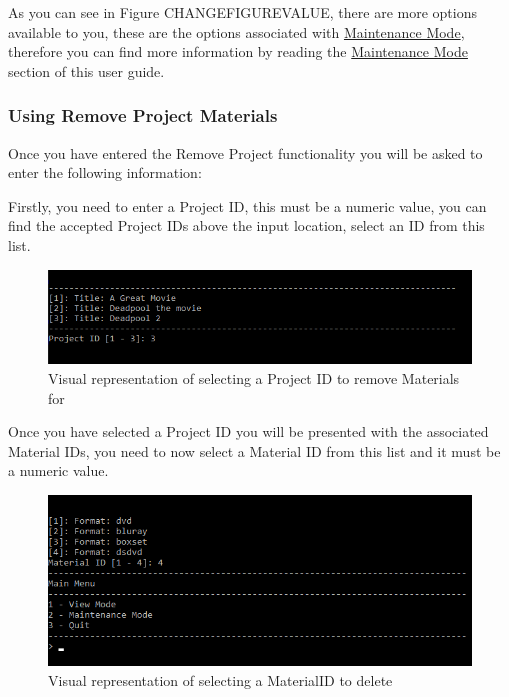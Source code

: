 \documentclass[
  english,
  a4paper,
,tablecaptionabove
]{scrartcl}
\begin{document}
As you can see in Figure CHANGEFIGUREVALUE, there are more options
available to you, these are the options associated with
\protect\hyperlink{using-maintenance-mode}{Maintenance Mode}, therefore
you can find more information by reading the
\protect\hyperlink{using-maintenance-mode}{Maintenance Mode} section of
this user guide.

\newpage

\hypertarget{using-remove-project-materials}{%
\subsubsection{Using Remove Project
Materials}\label{using-remove-project-materials}}

Once you have entered the Remove Project functionality you will be asked
to enter the following information:

Firstly, you need to enter a Project ID, this must be a numeric value,
you can find the accepted Project IDs above the input location, select
an ID from this list.

\begin{figure}
\centering
\includegraphics{images/user-guide/maintenance-mode/remove-project-select-id.png}
\caption{Visual representation of selecting a Project ID to remove
Materials for}
\end{figure}

Once you have selected a Project ID you will be presented with the
associated Material IDs, you need to now select a Material ID from this
list and it must be a numeric value.

\begin{figure}
\centering
\includegraphics{images/user-guide/maintenance-mode/remove-project-materials-select-id.png}
\caption{Visual representation of selecting a MaterialID to delete}
\end{figure}
\end{document}
